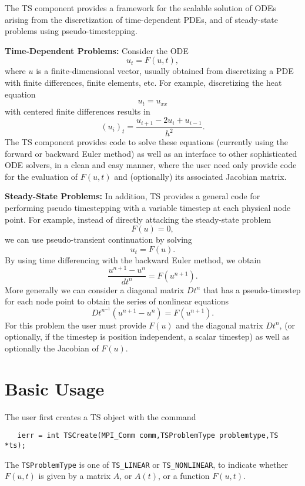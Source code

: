 The TS component provides a framework for the scalable solution of ODEs
arising from the discretization of time-dependent PDEs, and of
steady-state problems using pseudo-timestepping.

\vspace{.2cm}

\noindent
{\bf Time-Dependent Problems:} Consider the ODE
\[
              u_t = F(u,t),
\]
where $ u $ is a finite-dimensional vector, usually obtained from
discretizing a PDE with finite differences, finite elements, etc.
For example, discretizing the heat equation 
\[
          u_t = u_{xx} 
\]
with centered finite differences results in 
\[
          (u_i)_t = \frac{u_{i+1} - 2 u_{i} + u_{i-1}}{h^2}.
\]
The TS component provides code to solve these equations (currently 
using the forward or backward Euler method) as well as an interface to 
other sophisticated ODE solvers, in a clean and easy manner,
where the user need only provide code for the evaluation of $ F(u,t) $ and 
(optionally) its associated Jacobian matrix.

\vspace{.2cm}

\noindent
{\bf Steady-State Problems:} 
In addition, TS provides a general code for performing pseudo timestepping
with a variable timestep at each physical node point. For example, instead of
directly attacking the steady-state problem
\[
           F(u) = 0,
\]
we can use pseudo-transient continuation by solving
\[
           u_t = F(u).
\]
By using time differencing with the backward Euler method, we obtain
\[
           \frac{u^{n+1} - u^{n}}{dt^{n}} = F(u^{n+1}).
\]
More generally we can consider a diagonal matrix $ Dt^{n} $ that has a
pseudo-timestep for each node point to obtain the series of nonlinear equations
\[
        Dt^{n^{-1}}(u^{n+1} - u^{n}) =  F(u^{n+1}).
\]
For this problem the user must provide $ F(u) $ and the diagonal 
matrix $ Dt^{n} $, (or optionally, if the timestep is position independent,
a scalar timestep) as well as optionally the Jacobian of $ F(u).$ 

\section{Basic Usage}

The user first creates a TS object with the command
\begin{verbatim}
   ierr = int TSCreate(MPI_Comm comm,TSProblemType problemtype,TS *ts);
\end{verbatim}
 The {\tt TSProblemType} 
is one of {\tt TS\_LINEAR} or {\tt TS\_NONLINEAR},
to indicate whether $ F(u,t) $ is given by a matrix $ A $, or $ A(t) $, or a
function $ F(u,t). $

